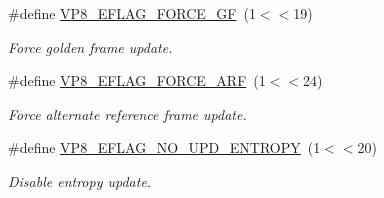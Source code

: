 \begin{DoxyCompactItemize}
\#define \hyperlink{group__vp8__encoder_gacb64c00adcb361f72a9a3028eb12f5ff}{\-V\-P8\-\_\-\-E\-F\-L\-A\-G\-\_\-\-F\-O\-R\-C\-E\-\_\-\-G\-F}~(1$<$$<$19)
\begin{DoxyCompactList}\small\item\em \-Force golden frame update. \end{DoxyCompactList}\item 
\#define \hyperlink{group__vp8__encoder_ga50584fe4bdb62ff935347576539650b7}{\-V\-P8\-\_\-\-E\-F\-L\-A\-G\-\_\-\-F\-O\-R\-C\-E\-\_\-\-A\-R\-F}~(1$<$$<$24)
\begin{DoxyCompactList}\small\item\em \-Force alternate reference frame update. \end{DoxyCompactList}\item 
\#define \hyperlink{group__vp8__encoder_ga5b91ad179910d4efc23aef66c7b2148b}{\-V\-P8\-\_\-\-E\-F\-L\-A\-G\-\_\-\-N\-O\-\_\-\-U\-P\-D\-\_\-\-E\-N\-T\-R\-O\-P\-Y}~(1$<$$<$20)
\begin{DoxyCompactList}\small\item\em \-Disable entropy update. \end{DoxyCompactList}\end{DoxyCompactItemize}
